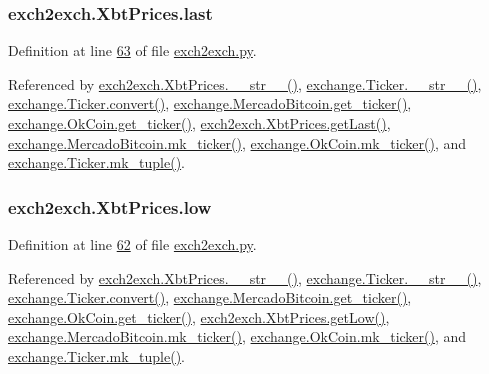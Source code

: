 \subsubsection[{\texorpdfstring{last}{last}}]{\setlength{\rightskip}{0pt plus 5cm}exch2exch.\+Xbt\+Prices.\+last}\hypertarget{classexch2exch_1_1_xbt_prices_a1da8993986574b27edcaf7259e78c899}{}\label{classexch2exch_1_1_xbt_prices_a1da8993986574b27edcaf7259e78c899}


Definition at line \hyperlink{exch2exch_8py_source_l00063}{63} of file \hyperlink{exch2exch_8py_source}{exch2exch.\+py}.



Referenced by \hyperlink{exch2exch_8py_source_l00091}{exch2exch.\+Xbt\+Prices.\+\_\+\+\_\+str\+\_\+\+\_\+()}, \hyperlink{exchange_8py_source_l00099}{exchange.\+Ticker.\+\_\+\+\_\+str\+\_\+\+\_\+()}, \hyperlink{exchange_8py_source_l00055}{exchange.\+Ticker.\+convert()}, \hyperlink{exchange_8py_source_l00306}{exchange.\+Mercado\+Bitcoin.\+get\+\_\+ticker()}, \hyperlink{exchange_8py_source_l00371}{exchange.\+Ok\+Coin.\+get\+\_\+ticker()}, \hyperlink{exch2exch_8py_source_l00082}{exch2exch.\+Xbt\+Prices.\+get\+Last()}, \hyperlink{exchange_8py_source_l00320}{exchange.\+Mercado\+Bitcoin.\+mk\+\_\+ticker()}, \hyperlink{exchange_8py_source_l00385}{exchange.\+Ok\+Coin.\+mk\+\_\+ticker()}, and \hyperlink{exchange_8py_source_l00084}{exchange.\+Ticker.\+mk\+\_\+tuple()}.

\subsubsection[{\texorpdfstring{low}{low}}]{\setlength{\rightskip}{0pt plus 5cm}exch2exch.\+Xbt\+Prices.\+low}\hypertarget{classexch2exch_1_1_xbt_prices_a8cef13f833a894d4fc5b8296bb4906fa}{}\label{classexch2exch_1_1_xbt_prices_a8cef13f833a894d4fc5b8296bb4906fa}


Definition at line \hyperlink{exch2exch_8py_source_l00062}{62} of file \hyperlink{exch2exch_8py_source}{exch2exch.\+py}.



Referenced by \hyperlink{exch2exch_8py_source_l00091}{exch2exch.\+Xbt\+Prices.\+\_\+\+\_\+str\+\_\+\+\_\+()}, \hyperlink{exchange_8py_source_l00099}{exchange.\+Ticker.\+\_\+\+\_\+str\+\_\+\+\_\+()}, \hyperlink{exchange_8py_source_l00055}{exchange.\+Ticker.\+convert()}, \hyperlink{exchange_8py_source_l00306}{exchange.\+Mercado\+Bitcoin.\+get\+\_\+ticker()}, \hyperlink{exchange_8py_source_l00371}{exchange.\+Ok\+Coin.\+get\+\_\+ticker()}, \hyperlink{exch2exch_8py_source_l00079}{exch2exch.\+Xbt\+Prices.\+get\+Low()}, \hyperlink{exchange_8py_source_l00320}{exchange.\+Mercado\+Bitcoin.\+mk\+\_\+ticker()}, \hyperlink{exchange_8py_source_l00385}{exchange.\+Ok\+Coin.\+mk\+\_\+ticker()}, and \hyperlink{exchange_8py_source_l00084}{exchange.\+Ticker.\+mk\+\_\+tuple()}.

